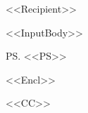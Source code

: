 \documentclass[%
<<DocumentClassOptions>>]{scrlttr2}
\begin{document}
\begin{letter}{%
<<Recipient>>
}

<<InputBody>>

\ps
<<PS>>

<<Encl>>

<<CC>>

\end{letter}
\end{document}
